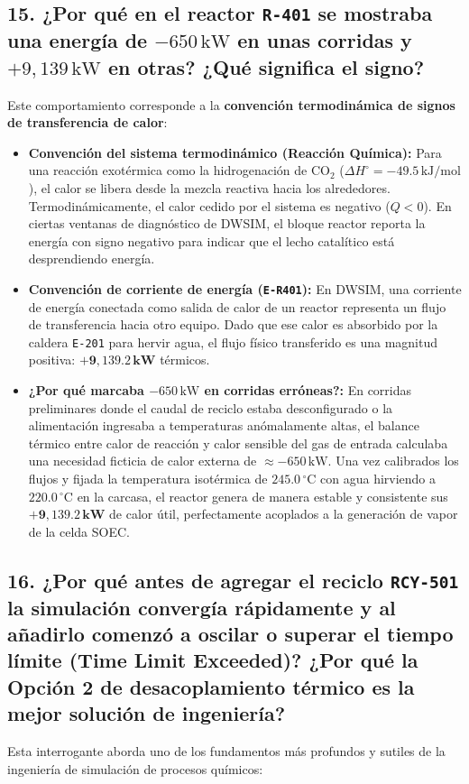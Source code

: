 \documentclass[11pt,a4paper]{article}
\begin{document}
\subsection{15. ¿Por qué en el reactor \texttt{R-401} se mostraba una energía de \texorpdfstring{$-650\,\text{kW}$}{-650 kW} en unas corridas y \texorpdfstring{$+9{,}139\,\text{kW}$}{+9,139 kW} en otras? ¿Qué significa el signo?}
Este comportamiento corresponde a la \textbf{convención termodinámica de signos de transferencia de calor}:
\begin{itemize}
    \item \textbf{Convención del sistema termodinámico (Reacción Química):}
    Para una reacción exotérmica como la hidrogenación de $\text{CO}_2$ ($\Delta H^\circ = -49.5\,\text{kJ/mol}$), el calor se libera desde la mezcla reactiva hacia los alrededores. Termodinámicamente, el calor cedido por el sistema es negativo ($Q < 0$). En ciertas ventanas de diagnóstico de DWSIM, el bloque reactor reporta la energía con signo negativo para indicar que el lecho catalítico está desprendiendo energía.
    \item \textbf{Convención de corriente de energía (\texttt{E-R401}):}
    En DWSIM, una corriente de energía conectada como salida de calor de un reactor representa un flujo de transferencia hacia otro equipo. Dado que ese calor es absorbido por la caldera \texttt{E-201} para hervir agua, el flujo físico transferido es una magnitud positiva: $\mathbf{+9{,}139.2\,\text{kW}}$ térmicos.
    \item \textbf{¿Por qué marcaba $-650\,\text{kW}$ en corridas erróneas?:} En corridas preliminares donde el caudal de reciclo estaba desconfigurado o la alimentación ingresaba a temperaturas anómalamente altas, el balance térmico entre calor de reacción y calor sensible del gas de entrada calculaba una necesidad ficticia de calor externa de $\approx -650\,\text{kW}$. Una vez calibrados los flujos y fijada la temperatura isotérmica de $245.0\,^\circ\text{C}$ con agua hirviendo a $220.0\,^\circ\text{C}$ en la carcasa, el reactor genera de manera estable y consistente sus $\mathbf{+9{,}139.2\,\text{kW}}$ de calor útil, perfectamente acoplados a la generación de vapor de la celda SOEC.
\end{itemize}

\subsection{16. ¿Por qué antes de agregar el reciclo \texttt{RCY-501} la simulación convergía rápidamente y al añadirlo comenzó a oscilar o superar el tiempo límite (Time Limit Exceeded)? ¿Por qué la Opción 2 de desacoplamiento térmico es la mejor solución de ingeniería?}
Esta interrogante aborda uno de los fundamentos más profundos y sutiles de la ingeniería de simulación de procesos químicos:
\end{document}
